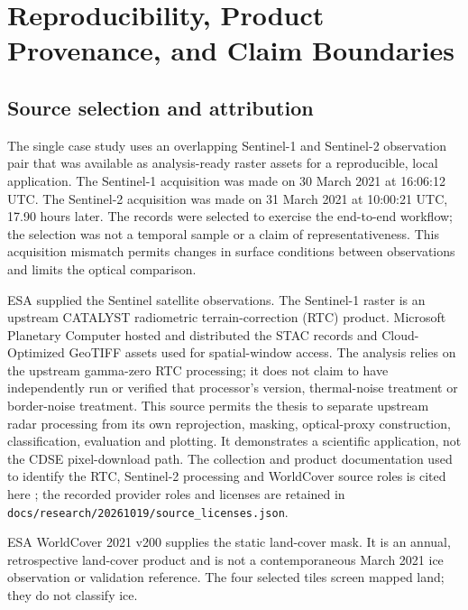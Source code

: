 \chapter{Reproducibility, Product Provenance, and Claim Boundaries}
\label{app:repro}

\section{Source selection and attribution}

The single case study uses an overlapping Sentinel-1 and Sentinel-2 observation pair that
was available as analysis-ready raster assets for a reproducible, local application. The
Sentinel-1 acquisition was made on 30 March 2021 at 16:06:12 UTC. The Sentinel-2 acquisition
was made on 31 March 2021 at 10:00:21 UTC, 17.90 hours later. The records were selected to
exercise the end-to-end workflow; the selection was not a temporal sample or a claim of
representativeness. This acquisition mismatch permits changes in surface conditions between
observations and limits the optical comparison.

ESA supplied the Sentinel satellite observations. The Sentinel-1 raster is an upstream
CATALYST radiometric terrain-correction (RTC) product. Microsoft Planetary Computer hosted
and distributed the STAC records and Cloud-Optimized GeoTIFF assets used for spatial-window
access. The analysis relies on the upstream gamma-zero RTC processing; it does not claim to
have independently run or verified that processor's version, thermal-noise treatment or
border-noise treatment. This source permits the thesis to separate upstream radar processing
from its own reprojection, masking, optical-proxy construction, classification, evaluation
and plotting. It demonstrates a scientific application, not the CDSE pixel-download path.
The collection and product documentation used to identify the RTC, Sentinel-2 processing
and WorldCover source roles is cited here \citep{pc-s1-rtc,s2-processing,worldcover2021};
the recorded provider roles and licenses are retained in
\texttt{docs/research/20261019/source\_licenses.json}.

ESA WorldCover 2021 v200 supplies the static land-cover mask. It is an annual, retrospective
land-cover product and is not a contemporaneous March 2021 ice observation or validation
reference. The four selected tiles screen mapped land; they do not classify ice.

